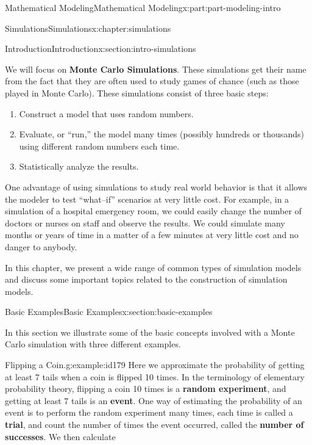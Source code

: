 \documentclass[oneside,10pt,]{book}
\newcommand{\terminology}[1]{\textbf{#1}}
\numberwithin{equation}{section}
\begin{document}
\begin{partptx}{Mathematical Modeling}{}{Mathematical Modeling}{}{}{x:part:part-modeling-intro}
\begin{chapterptx}{Simulations}{}{Simulations}{}{}{x:chapter:simulations}
\begin{sectionptx}{Introduction}{}{Introduction}{}{}{x:section:intro-simulations}
\begin{introduction}{}
\begin{enumerate}
\end{enumerate}
We will focus on \terminology{Monte Carlo Simulations}. These simulations get their name from the fact that they are often used to study games of chance (such as those played in Monte Carlo). These simulations consist of three basic steps:%
%
\begin{enumerate}
\item{}Construct a model that uses random numbers.%
\item{}Evaluate, or ``run,'' the model many times (possibly hundreds or thousands) using different random numbers each time.%
\item{}Statistically analyze the results.%
\end{enumerate}
One advantage of using simulations to study real world behavior is that it allows the modeler to test ``what–if'' scenarios at very little cost. For example, in a simulation of a hospital emergency room, we could easily change the number of doctors or nurses on staff and observe the results. We could simulate many months or years of time in a matter of a few minutes at very little cost and no danger to anybody.%
\par
In this chapter, we present a wide range of common types of simulation models and discuss some important topics related to the construction of simulation models.%
\end{introduction}%
\end{sectionptx}
%
%
\typeout{************************************************}
\typeout{************************************************}
%
\begin{sectionptx}{Basic Examples}{}{Basic Examples}{}{}{x:section:basic-examples}
\begin{introduction}{}%
In this section we illustrate some of the basic concepts involved with a Monte Carlo simulation with three different examples.%
\end{introduction}%
\begin{example}{Flipping a Coin.}{g:example:id179}%
Here we approximate the probability of getting at least 7 tails when a coin is flipped 10 times. In the terminology of elementary probability theory, flipping a coin 10 times is a \terminology{random experiment}, and getting at least 7 tails is an \terminology{event}. One way of estimating the probability of an event is to perform the random experiment many times, each time is called a \terminology{trial}, and count the number of times the event occurred, called the \terminology{number of successes}. We then calculate%

\end{example}
\end{sectionptx}
\end{chapterptx}
\end{partptx}
\end{document}
